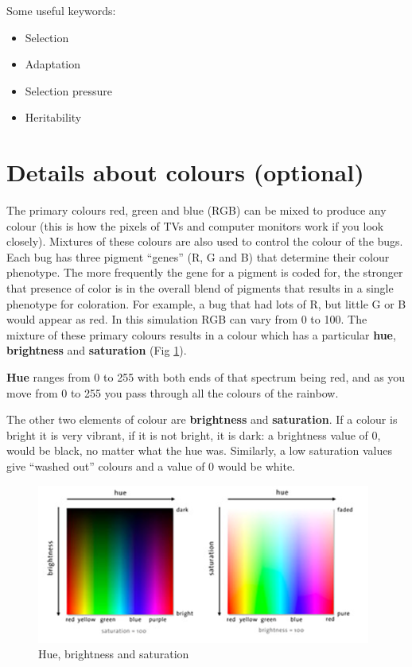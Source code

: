 \documentclass[
  a4paper]{book}
\providecommand{\tightlist}{%
  \setlength{\itemsep}{0pt}\setlength{\parskip}{0pt}}
\begin{document}
Some useful keywords:

\begin{itemize}
\tightlist
\item
  Selection
\item
  Adaptation
\item
  Selection pressure
\item
  Heritability
\end{itemize}

\section{Details about colours (optional)}\label{details-about-colours-optional}

The primary colours red, green and blue (RGB) can be mixed to produce any colour (this is how the pixels of TVs and computer monitors work if you look closely). Mixtures of these colours are also used to control the colour of the bugs. Each bug has three pigment ``genes'' (R, G and B) that determine their colour phenotype. The more frequently the gene for a pigment is coded for, the stronger that presence of color is in the overall blend of pigments that results in a single phenotype for coloration. For example, a bug that had lots of R, but little G or B would appear as red. In this simulation RGB can vary from 0 to 100. The mixture of these primary colours results in a colour which has a particular \textbf{hue}, \textbf{brightness} and \textbf{saturation} (Fig \ref{fig:colours}).

\textbf{Hue} ranges from 0 to 255 with both ends of that spectrum being red, and as you move from 0 to 255 you pass through all the colours of the rainbow.

The other two elements of colour are \textbf{brightness} and \textbf{saturation}. If a colour is bright it is very vibrant, if it is not bright, it is dark: a brightness value of 0, would be black, no matter what the hue was. Similarly, a low saturation values give ``washed out'' colours and a value of 0 would be white.

\begin{figure}

{\centering \includegraphics[width=0.5\linewidth]{images/colours} 

}

\caption{Hue, brightness and saturation}\label{fig:colours}
\end{figure}
\end{document}
